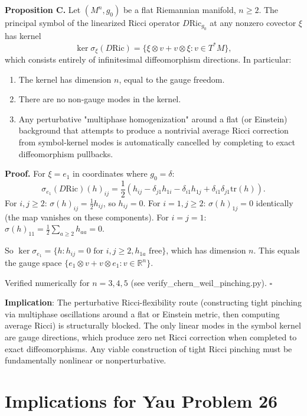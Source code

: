 \textbf{Proposition C.} Let $(M^n, g_0)$ be a flat Riemannian manifold, $n \geq 2$.
The principal symbol of the linearized Ricci operator $D\mathrm{Ric}_{g_0}$ at any 
nonzero covector $\xi$ has kernel
\[
\ker \sigma_\xi(D\mathrm{Ric}) = \{\xi \otimes v + v \otimes \xi : v \in T^*M\},
\]
which consists entirely of infinitesimal diffeomorphism directions. In particular:
\begin{enumerate}
\item The kernel has dimension $n$, equal to the gauge freedom.
\item There are no non-gauge modes in the kernel.
\item Any perturbative "multiphase homogenization" around a flat (or Einstein) background
      that attempts to produce a nontrivial average Ricci correction from symbol-kernel modes
      is automatically cancelled by completing to exact diffeomorphism pullbacks.
\end{enumerate}

\textbf{Proof.} For $\xi = e_1$ in coordinates where $g_0 = \delta$:
\[
\sigma_{e_1}(D\mathrm{Ric})(h)_{ij} = \frac{1}{2}\left(h_{ij} - \delta_{j1}h_{1i} - \delta_{i1}h_{1j} + \delta_{i1}\delta_{j1}\mathrm{tr}(h)\right).
\]
For $i,j \geq 2$: $\sigma(h)_{ij} = \frac{1}{2}h_{ij}$, so $h_{ij} = 0$.
For $i = 1, j \geq 2$: $\sigma(h)_{1j} = 0$ identically (the map vanishes on these components).
For $i = j = 1$: $\sigma(h)_{11} = \frac{1}{2}\sum_{a \geq 2} h_{aa} = 0$.

So $\ker\sigma_{e_1} = \{h : h_{ij} = 0 \text{ for } i,j \geq 2, h_{1a} \text{ free}\}$,
which has dimension $n$. This equals the gauge space 
$\{e_1 \otimes v + v \otimes e_1 : v \in \mathbb{R}^n\}$.

Verified numerically for $n = 3, 4, 5$ (see verify\_chern\_weil\_pinching.py). $\square$

\textbf{Implication}: The perturbative Ricci-flexibility route (constructing tight pinching
via multiphase oscillations around a flat or Einstein metric, then computing average Ricci)
is structurally blocked. The only linear modes in the symbol kernel are gauge directions,
which produce zero net Ricci correction when completed to exact diffeomorphisms.
Any viable construction of tight Ricci pinching must be fundamentally nonlinear or nonperturbative.


\section{Implications for Yau Problem 26}


